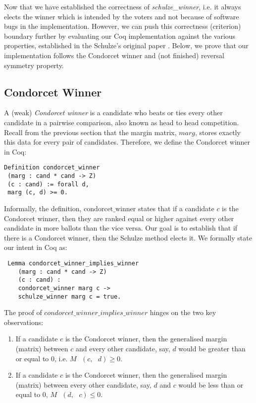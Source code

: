 \documentclass[compsoc,conference,a4paper,10pt,times]{IEEEtran}
\begin{document}
Now that we have established the correctness of \textit{schulze\_winner},
i.e. it always elects the winner which is intended by the voters and 
not because of software bugs in the implementation. However, we can push this
correctness (criterion) boundary further by evaluating our Coq implementation against 
the various properties, established in the Schulze's 
original paper \cite{Schulze:2011:NMC}. Below, we prove that our 
implementation follows the Condorcet winner and (not finished)
reversal symmetry property. 


 
\subsection{Condorcet Winner}
	A (weak) \textit{Condorcet winner} is a candidate who beats or ties 
	every other candidate in a 
	pairwise comparison, also known as head to head competition. 
	Recall from the previous section that the margin matrix, $marg$, 
	stores exactly this data for every pair of candidates.
	Therefore, we define the Condorcet winner in Coq:

\begin{verbatim}
Definition condorcet_winner 
 (marg : cand * cand -> Z) 
 (c : cand) := forall d, 
 marg (c, d) >= 0.
\end{verbatim}

  Informally, the definition, $\mathrm{condorcet\_winner}$ states that 
  if a candidate $c$  is the Condorcet winner, then they are
  ranked equal or higher against
  every other candidate in more ballots than the vice versa. 
  Our goal is to establish that if there is a 
  Condorcet winner, then the Schulze method
  elects it. We formally state our intent 
  in Coq as:
 	
\begin{verbatim}
 Lemma condorcet_winner_implies_winner 
    (marg : cand * cand -> Z)
    (c : cand) : 
    condorcet_winner marg c -> 
    schulze_winner marg c = true. 

\end{verbatim}

  		
 The proof of $condorcet\_winner\_implies\_winner$ hinges on the two key observations:
 
 \begin{enumerate}
  \item If a candidate $c$ is the Condorcet winner, then the generalised margin (matrix) 
  between $c$
  and every other candidate, say, $d$ would be greater than or equal to 0, i.e. 
  $M \text{ } (c, \text{ }d) \geq 0$.
  
  \item If a candidate $c$ is the Condorcet winner, then the generalised margin  (matrix)
  between every other candidate, say, $d$ and $c$ would be less than or equal to 0, 
  $M \text{ } (d, \text{ }c) \leq 0$.
 \end{enumerate}
 
\end{document}
